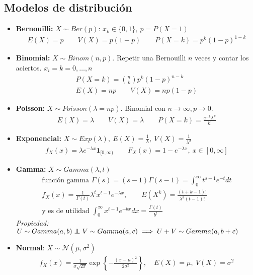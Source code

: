 \documentclass[a4paper,twocolumn]{extarticle}
\theoremstyle{remark}
\newcommand\indep{\protect\mathpalette{\protect\independenT}{\perp}}
\def\independenT#1#2{\mathrel{\rlap{$#1#2$}\mkern2mu{#1#2}}}
\newcommand{\normal}{\mathcal{N}}
\begin{document}
\subsection{Modelos de distribución}

\begin{itemize}
	\item \textbf{Bernouilli:} $X \sim Ber(p)$: $x_k \in \{0,1\},\ p = P(X = 1)$
	\begin{align*}
	E(X) = p\qquad V(X) = p(1-p) \qquad P(X = k) = p^k(1-p)^{1-k}
	\end{align*}
	\item \textbf{Binomial:} $X \sim Binom(n,p)$. Repetir una Bernouilli $n$ veces y contar los aciertos. $x_i = k = 0, \dots, n$
	\begin{align*}P(X = k) = \binom{n}{k}p^k(1-p)^{n-k}\\
	E(X) = np \qquad V(X) = np(1-p)
	\end{align*}
	\item \textbf{Poisson:} $X \sim Poisson(\lambda = np)$. Binomial con $n \to \infty, p \to 0$.
	\begin{align*}
	E(X) = \lambda \qquad V(X) = \lambda \qquad P(X = k) = \frac{e^{-k}\lambda^k}{k!}
	\end{align*}
	\item \textbf{Exponencial:} $X \sim Exp(\lambda),\ E(X) = \frac{1}{\lambda},\ V(X) = \frac{1}{\lambda^2}$
	\begin{align*}
	f_X(x) = \lambda e^{-\lambda x}\mathbf{1}_{[0,\infty)} \qquad F_X(x) = 1 - e^{-\lambda x},\ x \in [0, \infty]
	\end{align*}
	\item \textbf{Gamma:} $X \sim Gamma(\lambda, t)$
	\begin{align*}
	\text{función gamma } \Gamma(s) = (s-1)\Gamma(s-1) = \int_{0}^{\infty} t^{s-1}e^{-t}dt\\
	f_X(x) = \frac{1}{\Gamma(t)}\lambda^tx^{t-1}e^{-\lambda x},\qquad E(X^k) = \frac{(t+k-1)!}{\lambda^k(t-1)!} \\
	\text{y es de utilidad }\int_{0}^{\infty}x^{t-1}e^{-bx}dx = \frac{\Gamma(t)}{b^t}
	\end{align*}
	\textit{Propiedad:} $U \sim Gamma(a, b) \indep V \sim Gamma(a, c) \implies U + V \sim Gamma(a, b+c)$
	\item \textbf{Normal}: $X \sim \normal(\mu, \sigma^2)$
	\begin{align*}
	f_X(x) = \frac{1}{\sigma\sqrt{2\pi}}\exp\left\lbrace-\frac{(x-\mu)^2}{2\sigma^2}\right\rbrace, \quad E(X) = \mu,\ V(X) = \sigma^2
	\end{align*}
\end{itemize}
\end{document}
